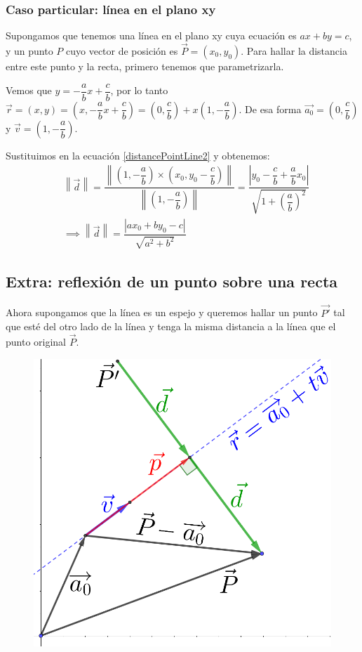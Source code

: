 \documentclass[12pt, fleqn]{report}                             %
\theoremstyle{break}                                            %
\newcommand{\Wrap}[1]{\left( #1 \right)}                        %
\newcommand{\abs}[1]{\left\lvert #1 \right\lvert}               %
\newcommand{\Abs}[1]{\left\lVert #1 \right\lVert}               %
\newcommand{\lVec}[1]{\overrightarrow{#1}}                      %
\begin{document}
    			\subsubsection{Caso particular: línea en el plano xy}
    			Supongamos que tenemos una línea en el plano xy cuya ecuación es $ax+by=c$, y un punto $P$ cuyo vector de posición es $\vec{P}=(x_0, y_0)$. Para hallar la distancia entre este punto y la recta, primero tenemos que parametrizarla.
    			
    			Vemos que $y=-\dfrac{a}{b}x+\dfrac{c}{b}$, por lo tanto $\vec{r} = (x, y) = \Wrap{x, -\dfrac{a}{b}x+\dfrac{c}{b}} = \Wrap{0, \dfrac{c}{b}} + x\Wrap{1, -\dfrac{a}{b}}$. De esa forma $\lVec{a_0}=\Wrap{0, \dfrac{c}{b}}$ y $\vec{v}=\Wrap{1, -\dfrac{a}{b}}$.
    			
    			Sustituimos en la ecuación \ref{distancePointLine2} y obtenemos:
    			\begin{align}
	    			&\Abs{\vec{d}} = \dfrac{\Abs{\Wrap{1, -\dfrac{a}{b}} \times \Wrap{x_0, y_0 - \dfrac{c}{b}}}}{\Abs{\Wrap{1, -\dfrac{a}{b}}}} = \dfrac{\abs{y_0 - \dfrac{c}{b} + \dfrac{a}{b}x_0}}{\sqrt{1 + \Wrap{\dfrac{a}{b}}^2}} \nonumber \\
	    			&\implies \Abs{\vec{d}} = \dfrac{\abs{ax_0 + by_0 - c}}{\sqrt{a^2 + b^2}} \label{distancePointLine3}
    			\end{align}
    		
    		\clearpage
    		
    		\subsection{Extra: reflexión de un punto sobre una recta}
    		Ahora supongamos que la línea es un espejo y queremos hallar un punto $\vec{P'}$ tal que esté del otro lado de la línea y tenga la misma distancia a la línea que el punto original $\vec{P}$.
    		
    		\begin{figure}[H]
    			\centering
    			\includegraphics[scale=1.65]{reflection.png}
    		\end{figure}
    	
\end{document}
